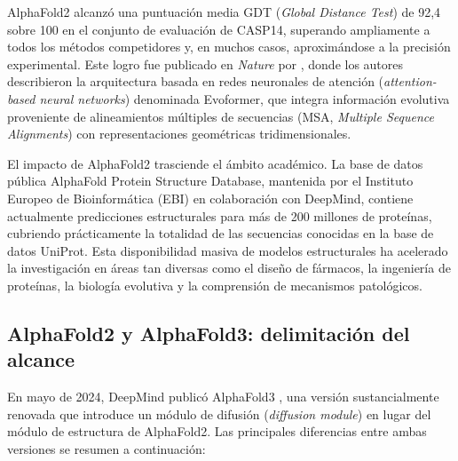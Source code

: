 AlphaFold2 alcanz\'o una puntuaci\'on media GDT (\textit{Global Distance Test}) de 92,4 sobre 100 en el conjunto de evaluaci\'on de CASP14, superando ampliamente a todos los m\'etodos competidores y, en muchos casos, aproxim\'andose a la precisi\'on experimental. Este logro fue publicado en \textit{Nature} por \citet{jumper2021highly}, donde los autores describieron la arquitectura basada en redes neuronales de atenci\'on (\textit{attention-based neural networks}) denominada Evoformer, que integra informaci\'on evolutiva proveniente de alineamientos m\'ultiples de secuencias (MSA, \textit{Multiple Sequence Alignments}) con representaciones geom\'etricas tridimensionales.

El impacto de AlphaFold2 trasciende el \'ambito acad\'emico. La base de datos p\'ublica AlphaFold Protein Structure Database, mantenida por el Instituto Europeo de Bioinform\'atica (EBI) en colaboraci\'on con DeepMind, contiene actualmente predicciones estructurales para m\'as de 200 millones de prote\'inas, cubriendo pr\'acticamente la totalidad de las secuencias conocidas en la base de datos UniProt. Esta disponibilidad masiva de modelos estructurales ha acelerado la investigaci\'on en \'areas tan diversas como el dise\~no de f\'armacos, la ingenier\'ia de prote\'inas, la biolog\'ia evolutiva y la comprensi\'on de mecanismos patol\'ogicos.

\subsection{AlphaFold2 y AlphaFold3: delimitaci\'on del alcance}
\label{subsec:af2_vs_af3}

En mayo de 2024, DeepMind public\'o AlphaFold3 \citep{abramson2024accurate}, una versi\'on
sustancialmente renovada que introduce un m\'odulo de difusi\'on (\textit{diffusion module})
en lugar del m\'odulo de estructura de AlphaFold2. Las principales diferencias entre ambas
versiones se resumen a continuaci\'on:

